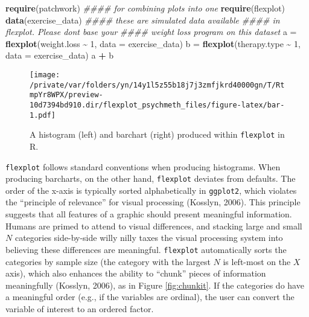 \documentclass[
  english,
  man]{apa6}
\newenvironment{Shaded}{\begin{snugshade}}{\end{snugshade}}
\newcommand{\CommentTok}[1]{\textcolor[rgb]{0.56,0.35,0.01}{\textit{#1}}}
\newcommand{\DataTypeTok}[1]{\textcolor[rgb]{0.13,0.29,0.53}{#1}}
\newcommand{\DecValTok}[1]{\textcolor[rgb]{0.00,0.00,0.81}{#1}}
\newcommand{\KeywordTok}[1]{\textcolor[rgb]{0.13,0.29,0.53}{\textbf{#1}}}
\newcommand{\NormalTok}[1]{#1}
\newcommand{\OperatorTok}[1]{\textcolor[rgb]{0.81,0.36,0.00}{\textbf{#1}}}
\newcommand{\StringTok}[1]{\textcolor[rgb]{0.31,0.60,0.02}{#1}}
\begin{document}
\begin{Shaded}
\begin{Highlighting}[]
\KeywordTok{require}\NormalTok{(patchwork) }\CommentTok{\#\#\#\# for combining plots into one}
\KeywordTok{require}\NormalTok{(flexplot)}
\KeywordTok{data}\NormalTok{(exercise\_data) }\CommentTok{\#\#\#\# these are simulated data available }
                    \CommentTok{\#\#\#\# in flexplot. Please don\textquotesingle{}t base your }
                    \CommentTok{\#\#\#\# weight loss program on this dataset}
\NormalTok{a =}\StringTok{ }\KeywordTok{flexplot}\NormalTok{(weight.loss }\OperatorTok{\textasciitilde{}}\StringTok{ }\DecValTok{1}\NormalTok{, }\DataTypeTok{data =}\NormalTok{ exercise\_data)}
\NormalTok{b =}\StringTok{ }\KeywordTok{flexplot}\NormalTok{(therapy.type }\OperatorTok{\textasciitilde{}}\StringTok{ }\DecValTok{1}\NormalTok{, }\DataTypeTok{data =}\NormalTok{ exercise\_data)}
\NormalTok{a }\OperatorTok{+}\StringTok{ }\NormalTok{b}
\end{Highlighting}
\end{Shaded}

\begin{figure}
\centering
\texttt{[image: /private/var/folders/yn/14y1l5z55b18j7j3zmfjkrd40000gn/T/RtmpYr8WPX/preview-10d7394bd910.dir/flexplot\_psychmeth\_files/figure-latex/bar-1.pdf]}
\caption{\label{fig:bar}A histogram (left) and barchart (right) produced within \texttt{flexplot} in R.}
\end{figure}

\normalsize

\texttt{flexplot} follows standard conventions when producing histograms. When producing barcharts, on the other hand, \texttt{flexplot} deviates from defaults. The order of the x-axis is typically sorted alphabetically in \texttt{ggplot2}, which violates the ``principle of relevance'' for visual processing (Kosslyn, 2006). This principle suggests that all features of a graphic should present meaningful information. Humans are primed to attend to visual differences, and stacking large and small \(N\) categories side-by-side willy nilly taxes the visual processing system into believing these differences are meaningful. \texttt{flexplot} automatically sorts the categories by sample size (the category with the largest \(N\) is left-most on the \(X\) axis), which also enhances the ability to ``chunk'' pieces of information meaningfully (Kosslyn, 2006), as in Figure \ref{fig:chunkit}. If the categories do have a meaningful order (e.g., if the variables are ordinal), the user can convert the variable of interest to an ordered factor.
\end{document}
